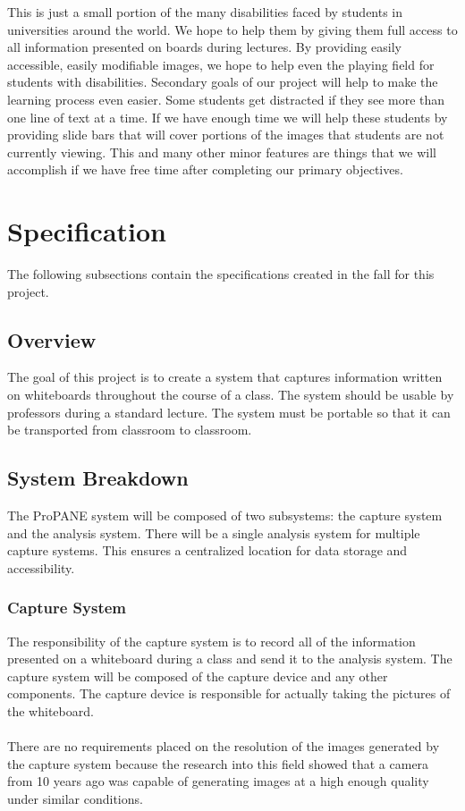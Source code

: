 \documentclass[]{article}
\begin{document}
\noindent This is just a small portion of the many disabilities faced by students in universities around the world. We hope to help them by giving them full access to all information presented on boards during lectures. By providing easily accessible, easily modifiable images, we hope to help even the playing field for students with disabilities.
Secondary goals of our project will help to make the learning process even easier. Some students get distracted if they see more than one line of text at a time. If we have enough time we will help these students by providing slide bars that will cover portions of the images that students are not currently viewing. This and many other minor features are things that we will accomplish if we have free time after completing our primary objectives. 
		
		
	\section{Specification}
		The following subsections contain the specifications created in the fall for this project.
		\subsection{Overview}
			The goal of this project is to create a system that captures information written on whiteboards throughout the course of a class. The system should be usable by professors during a standard lecture. The system must be portable so that it can be transported from classroom to classroom.
			
		\subsection{System Breakdown}
			The ProPANE system will be composed of two subsystems: the capture system and the analysis system. There will be a single analysis system for multiple capture systems. This ensures a centralized location for data storage and accessibility.
			
			\subsubsection{Capture System}
				The responsibility of the capture system is to record all of the information presented on a whiteboard during a class and send it to the analysis system. The capture system will be composed of the capture device and any other components. The capture device is responsible for actually taking the pictures of the whiteboard.\\
				\\
				There are no requirements placed on the resolution of the images generated by the capture system because the research into this field showed that a camera from 10 years ago was capable of generating images at a high enough quality under similar conditions. 
				
\end{document}
